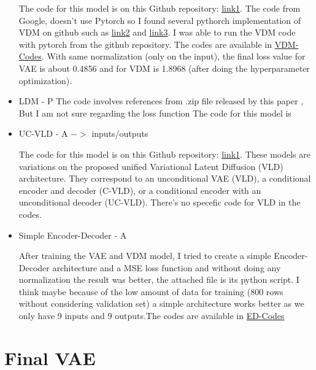 \documentclass{article}
\begin{document}
\begin{itemize}
The code for this model is on this Github repository: \href{https://github.com/google-research/vdm?tab=readme-ov-file}{link1}.
The code from Google, doesn't use Pytorch so I found several pythorch implementation of VDM on github such as \href{https://github.com/DavidRuhe/simple-variational-diffusion-models?tab=readme-ov-file}{link2} and \href{https://github.com/addtt/variational-diffusion-models?tab=readme-ov-file}{link3}.
I was able to run the VDM code with pytorch from the github repository. The codes are available in \href{https://ksuemailprod-my.sharepoint.com/:f:/g/personal/ghanaatian_ksu_edu/ErHzoMrrgF5JplZ5MKVOfI8BHHcqv4EBVr75vvKSQKCxCw?e=s2DnMd}{VDM-Codes}. With same normalization (only on the input), the final loss value for VAE is about 0.4856 and for VDM is 1.8968 (after doing the hyperparameter optimization).
\item LDM - P
The code involves references from .zip file released by this paper \cite{shmakov2024end}, But I am not sure regarding the loss function
The code for this model is 
\item UC-VLD - A $->$ inputs/outputs

The code for this model is on this Github repository: \href{https://openreview.net/forum?id=v7WWesSiOu}{link1}. These models are variations on the proposed unified Variational Latent Diffusion (VLD) architecture. They correspond to an unconditional VAE (VLD), a conditional encoder and decoder (C-VLD), or a conditional encoder with an unconditional decoder (UC-VLD). There's no specefic code for VLD in the codes.

\item Simple Encoder-Decoder - A

After training the VAE and VDM model, I tried to create a simple Encoder-Decoder architecture and a MSE loss function and without doing any normalization the result was better, the attached file is its python script. I think maybe because of the low amount of data for training  (800 rows without considering validation set) a simple architecture works better as we only have 9 inputs and 9 outputs.The codes are available in \href{https://ksuemailprod-my.sharepoint.com/:f:/g/personal/ghanaatian_ksu_edu/EoOYzAEZjGNHj3JdlJOCs50Br5Qrd0Ns81kRbANULvxrzQ?e=ZucWfZ}{ED-Codes}
\end{itemize}

\section{Final VAE} %
\end{document}

